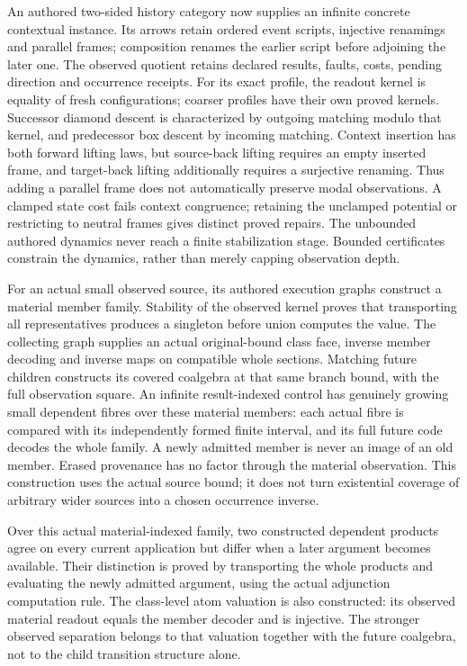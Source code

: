 \documentclass[11pt]{article}
\theoremstyle{definition}
\theoremstyle{remark}
\begin{document}
An authored two-sided history category now supplies an infinite concrete
contextual instance. Its arrows retain ordered event scripts, injective
renamings and parallel frames; composition renames the earlier script
before adjoining the later one. The observed quotient retains declared
results, faults, costs, pending direction and occurrence receipts. For its
exact profile, the readout kernel is equality of fresh configurations;
coarser profiles have their own proved kernels. Successor diamond descent
is characterized by outgoing matching modulo that kernel, and predecessor
box descent by incoming matching. Context insertion has both forward
lifting laws, but source-back lifting requires an empty inserted frame,
and target-back lifting additionally requires a surjective renaming.
Thus adding a parallel frame does not automatically preserve modal
observations. A clamped state cost fails context congruence; retaining the
unclamped potential or restricting to neutral frames gives distinct
proved repairs. The unbounded authored dynamics never reach a finite
stabilization stage. Bounded certificates constrain the dynamics,
rather than merely capping observation depth.

For an actual small observed source, its authored execution graphs
construct a material member family.  Stability of the observed kernel
proves that transporting all representatives produces a singleton before
union computes the value.  The collecting graph supplies an actual
original-bound class face, inverse member decoding and inverse maps on
compatible whole sections.  Matching future children constructs its
covered coalgebra at that same branch bound, with the full observation
square.  An infinite result-indexed control has genuinely growing small
dependent fibres over these material members: each actual fibre is
compared with its independently formed finite interval, and its full
future code decodes the whole family.  A newly admitted member is never
an image of an old member.  Erased provenance has no factor through the
material observation.  This construction uses the actual source bound;
it does not turn existential coverage of arbitrary wider sources into a
chosen occurrence inverse.

Over this actual material-indexed family, two constructed dependent
products agree on every current application but differ when a later
argument becomes available.  Their distinction is proved by transporting
the whole products and evaluating the newly admitted argument, using the
actual adjunction computation rule.  The class-level atom valuation is
also constructed: its observed material readout equals the member decoder
and is injective.  The stronger observed separation belongs to that
valuation together with the future coalgebra, not to the child transition
structure alone.
\end{document}
